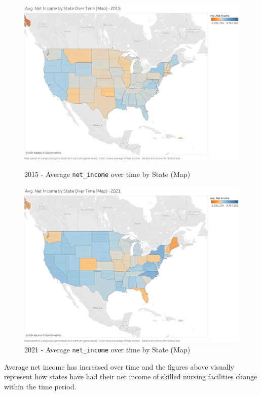 \documentclass{article}
\theoremstyle{mytheoremstyle}
\theoremstyle{mytheoremstyle}
\theoremstyle{myproblemstyle}
\begin{document}
\pagebreak
\begin{figure}[!h]
\centering
\begin{minipage}{\linewidth}
    \centering %
    \includegraphics[width=0.75\linewidth]{Images/Avg. Net Income by State Over Time (Map).png}
    \caption{2015 - Average \texttt{net\_income} over time by State (Map)}
    \label{fig:net_income_map}
\end{minipage}\vspace{1cm} %

\begin{minipage}{\linewidth}
    \centering %
    \includegraphics[width=0.75\linewidth]{Images/Avg. Net Income by State Over Time (Map)2021.png}
    \caption{2021 - Average \texttt{net\_income} over time by State (Map)}
    \label{fig:net_income_map_2021}
\end{minipage}
\end{figure}

\noindent Average net income has increased over time and the figures above visually represent how states have had their net income of skilled nursing facilities change within the time period. 
\end{document}

